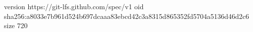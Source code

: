 version https://git-lfs.github.com/spec/v1
oid sha256:a8033e7b961d524b697dcaaa83ebcd42c3a8315d865352fd5704a5136d46d2c6
size 720
